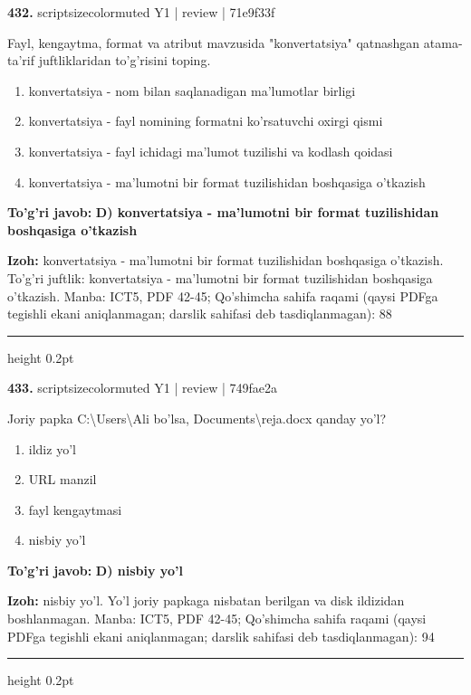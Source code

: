 \documentclass[10pt,a4paper]{article}
\begin{document}
{\bfseries\sffamily\color{ink} 432.} {scriptsizecolor{muted} Y1 | review | 71e9f33f}
\par
Fayl, kengaytma, format va atribut mavzusida "konvertatsiya" qatnashgan atama-ta'rif juftliklaridan to'g'risini toping.
\begin{enumerate}[label=\Alph*),leftmargin=9mm]
\item konvertatsiya - nom bilan saqlanadigan ma'lumotlar birligi
\item konvertatsiya - fayl nomining formatni ko'rsatuvchi oxirgi qismi
\item konvertatsiya - fayl ichidagi ma'lumot tuzilishi va kodlash qoidasi
\item konvertatsiya - ma'lumotni bir format tuzilishidan boshqasiga o'tkazish
\end{enumerate}
\begin{tcolorbox}[enhanced,breakable,colback=teal!4,colframe=teal!60!black,boxrule=0.45pt,arc=1.2mm,left=2.7mm,right=2.7mm,top=1.8mm,bottom=1.8mm,before skip=2mm,after skip=2mm]
{\bfseries\sffamily\color{teal}To'g'ri javob:} \textbf{D) konvertatsiya - ma'lumotni bir format tuzilishidan boshqasiga o'tkazish}
\par\smallskip
{\bfseries Izoh:} konvertatsiya - ma'lumotni bir format tuzilishidan boshqasiga o'tkazish. To'g'ri juftlik: konvertatsiya - ma'lumotni bir format tuzilishidan boshqasiga o'tkazish. Manba: ICT5, PDF 42-45; Qo'shimcha sahifa raqami (qaysi PDFga tegishli ekani aniqlanmagan; darslik sahifasi deb tasdiqlanmagan): 88
\end{tcolorbox}
\vspace{2mm}\hrule height 0.2pt\vspace{3mm}

{\bfseries\sffamily\color{ink} 433.} {scriptsizecolor{muted} Y1 | review | 749fae2a}
\par
Joriy papka C:\textbackslash{}Users\textbackslash{}Ali bo'lsa, Documents\textbackslash{}reja.docx qanday yo'l?
\begin{enumerate}[label=\Alph*),leftmargin=9mm]
\item ildiz yo'l
\item URL manzil
\item fayl kengaytmasi
\item nisbiy yo'l
\end{enumerate}
\begin{tcolorbox}[enhanced,breakable,colback=teal!4,colframe=teal!60!black,boxrule=0.45pt,arc=1.2mm,left=2.7mm,right=2.7mm,top=1.8mm,bottom=1.8mm,before skip=2mm,after skip=2mm]
{\bfseries\sffamily\color{teal}To'g'ri javob:} \textbf{D) nisbiy yo'l}
\par\smallskip
{\bfseries Izoh:} nisbiy yo'l. Yo'l joriy papkaga nisbatan berilgan va disk ildizidan boshlanmagan. Manba: ICT5, PDF 42-45; Qo'shimcha sahifa raqami (qaysi PDFga tegishli ekani aniqlanmagan; darslik sahifasi deb tasdiqlanmagan): 94
\end{tcolorbox}
\vspace{2mm}\hrule height 0.2pt\vspace{3mm}
\end{document}
